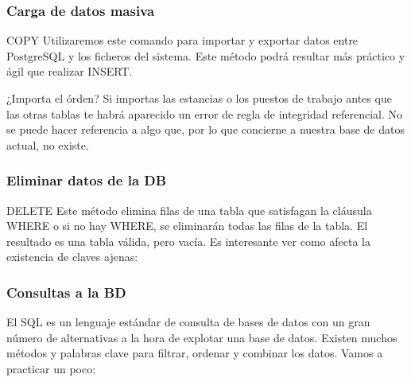 \documentclass{classes/beamer_GeomaticaUA}
\begin{document}
\begin{frame}[fragile]
\frametitle{Carga de datos masiva}

\begin{block}{COPY}
Utilizaremos este comando para importar y exportar datos entre PostgreSQL y los ficheros del sistema. Este método podrá resultar más práctico y ágil que realizar INSERT.
\end{block}



\begin{alertblock}{¿Importa el órden?}
Si importas las estancias o los puestos de trabajo antes que las otras tablas te habrá aparecido un error de regla de integridad referencial. No se puede hacer referencia a algo que, por lo que concierne a nuestra base de datos actual, no existe.
\end{alertblock}

\end{frame}


\begin{frame}[fragile]
\frametitle{Eliminar datos de la DB}

\begin{block}{DELETE}
Este método elimina filas de una tabla que satisfagan la cláusula WHERE o si no hay WHERE, se eliminarán todas las filas de la tabla. El resultado es una tabla válida, pero vacía. Es interesante ver como afecta la existencia de claves ajenas:
\end{block}



\end{frame}


\begin{frame}[fragile]
\frametitle{Consultas a la BD}

El SQL es un lenguaje estándar de consulta de bases de datos con un gran número de alternativas a la hora de explotar una base de datos. Existen muchos métodos y palabras clave para filtrar, ordenar y combinar los datos. Vamos a practicar un poco:



\end{frame}
\end{document}

